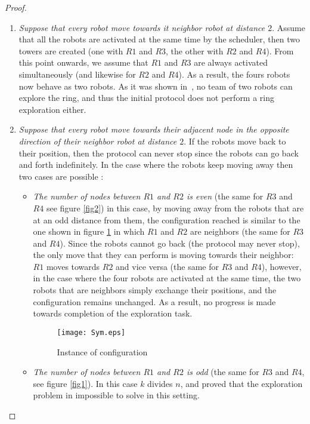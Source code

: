 \documentclass[12pt]{llncs}
\begin{document}
\begin{proof}
\begin{enumerate}
\item {\textit{Suppose that every robot move towards it neighbor robot at distance $2$}}. Assume that all the robots are activated at the same time by the scheduler, then two towers are created (one with $R1$ and $R3$, the other with $R2$ and $R4$). From this point onwards, we assume that $R1$ and $R3$ are always activated simultaneously (and likewise for $R2$ and $R4$). As a result, the fours robots now behave as two robots. As it was shown in~\cite{stap09}, no team of two robots can explore the ring, and thus the initial protocol does not perform a ring exploration either.
\item {\textit{Suppose that every robot move towards their adjacent node in the opposite direction of their neighbor robot at distance $2$}}. If the robots move back to their position, then the protocol can never stop since the robots can go back and forth indefinitely. In the case where the robots keep moving away then two cases are possible : 
\begin{itemize}
\item {\textit{The number of nodes between $R1$ and $R2$ is even} (the same for $R3$ and $R4$ see figure \ref{fig2})}  in this case, by moving away from the robots that are at an odd distance from them, the configuration reached is similar to the one shown in figure \ref{fig:figr3} in which $R1$ and $R2$ are neighbors (the same for $R3$ and $R4$). Since the robots cannot go back (the protocol may never stop), the only move that they can perform is moving towards their neighbor: $R1$ moves towards $R2$ and vice versa (the same for $R3$ and $R4$), however, in the case where the four robots are activated at the same time, the two robots that are neighbors simply exchange their positions, and the configuration remains unchanged. As a result, no progress is made towards completion of the exploration task. 
  
\begin{figure}[H]
  \centering
  \texttt{[image: Sym.eps]}
    \caption{Instance of configuration} 
    \label{fig:figr3}
\end{figure}


\item {\textit{The number of nodes between $R1$ and $R2$ is odd} (the same for $R3$ and $R4$, see figure \ref{fig1})}. In this case $k$ divides $n$, and \cite{davi07} proved that the exploration problem in impossible to solve in this setting.
\end{itemize}  
\end{enumerate}


\end{proof}
\end{document}
